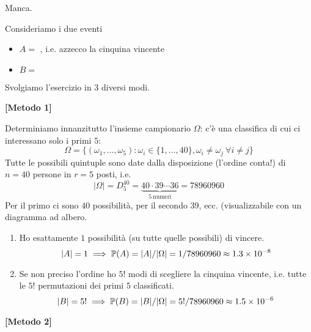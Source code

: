 \begin{enumerate}
\end{enumerate}

\Soluzione

Manca.

\Soluzione

Consideriamo i due eventi
\begin{itemize}
	\item $A=$ , i.e. azzecco la cinquina vincente
	\item $B=$ 
\end{itemize}

Svolgiamo l'esercizio in $3$ diversi modi.

\textbf{[Metodo 1]}

Determiniamo innanzitutto l'insieme campionario $\Omega $: c'è una classifica di cui ci interessano solo i primi $5$:
\begin{equation*}
	\Omega =\{(\omega _{1} ,\dots ,\omega _{5}) :\omega _{i} \in \{1,\dots,40\} ,\omega _{i} \neq \omega _{j} \ \forall i\neq j\}
\end{equation*}
Tutte le possibili quintuple sono date dalla disposizione (l'ordine conta!) di $n=40$ persone in $r=5$ posti, i.e.
\begin{equation*}
	| \Omega | =D_{5}^{40} =\underbrace{40\cdot 39\cdots 36}_{5\ \text{numeri}} =78960960
\end{equation*}
Per il primo ci sono $40$ possibilità, per il secondo $39$, ecc. (visualizzabile con un diagramma ad albero.
\begin{enumerate}
	\item Ho esattamente $1$ possibilità (su tutte quelle possibili) di vincere.
	\begin{equation*}
		| A| =1\implies \mathbb{P}(A) =| A| /| \Omega | =1/78960960\approx 1.3\times 10^{-8}
	\end{equation*}
	\item Se non preciso l'ordine ho $5!$ modi di scegliere la cinquina vincente, i.e. tutte le $5!$ permutazioni dei primi $5$ classificati.
	\begin{equation*}
		| B| =5!\implies \mathbb{P}(B) =| B| /| \Omega | =5!/78960960\approx 1.5\times 10^{-6}
	\end{equation*}
\end{enumerate}

\textbf{[Metodo 2]}

